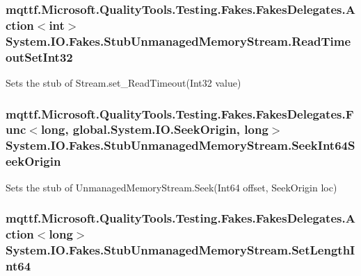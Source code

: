 \hypertarget{class_system_1_1_i_o_1_1_fakes_1_1_stub_unmanaged_memory_stream_a6ac0528dc3fd07f63b25965132229dd6}{
\subsubsection[{Read\-Timeout\-Set\-Int32}]{\setlength{\rightskip}{0pt plus 5cm}mqttf.\-Microsoft.\-Quality\-Tools.\-Testing.\-Fakes.\-Fakes\-Delegates.\-Action$<$int$>$ System.\-I\-O.\-Fakes.\-Stub\-Unmanaged\-Memory\-Stream.\-Read\-Timeout\-Set\-Int32}}\label{class_system_1_1_i_o_1_1_fakes_1_1_stub_unmanaged_memory_stream_a6ac0528dc3fd07f63b25965132229dd6}


Sets the stub of Stream.\-set\-\_\-\-Read\-Timeout(\-Int32 value)

\hypertarget{class_system_1_1_i_o_1_1_fakes_1_1_stub_unmanaged_memory_stream_ab7f0c2671bb705ce761e375bec063ff0}{
\subsubsection[{Seek\-Int64\-Seek\-Origin}]{\setlength{\rightskip}{0pt plus 5cm}mqttf.\-Microsoft.\-Quality\-Tools.\-Testing.\-Fakes.\-Fakes\-Delegates.\-Func$<$long, global.\-System.\-I\-O.\-Seek\-Origin, long$>$ System.\-I\-O.\-Fakes.\-Stub\-Unmanaged\-Memory\-Stream.\-Seek\-Int64\-Seek\-Origin}}\label{class_system_1_1_i_o_1_1_fakes_1_1_stub_unmanaged_memory_stream_ab7f0c2671bb705ce761e375bec063ff0}


Sets the stub of Unmanaged\-Memory\-Stream.\-Seek(\-Int64 offset, Seek\-Origin loc)

\hypertarget{class_system_1_1_i_o_1_1_fakes_1_1_stub_unmanaged_memory_stream_a74eb68d4c14f4f5be874b4beb91ee676}{
\subsubsection[{Set\-Length\-Int64}]{\setlength{\rightskip}{0pt plus 5cm}mqttf.\-Microsoft.\-Quality\-Tools.\-Testing.\-Fakes.\-Fakes\-Delegates.\-Action$<$long$>$ System.\-I\-O.\-Fakes.\-Stub\-Unmanaged\-Memory\-Stream.\-Set\-Length\-Int64}}\label{class_system_1_1_i_o_1_1_fakes_1_1_stub_unmanaged_memory_stream_a74eb68d4c14f4f5be874b4beb91ee676}


